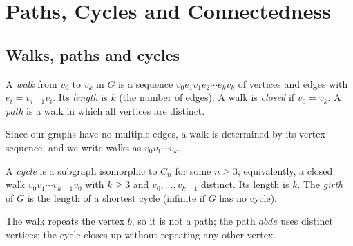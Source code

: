 \chapter{Paths, Cycles and Connectedness}


\section{Walks, paths and cycles}

\begin{definition}
A \emph{walk} from $v_0$ to $v_k$ in $G$ is a sequence $v_0e_1v_1e_2\cdots e_kv_k$ of
vertices and edges with $e_i = v_{i-1}v_i$. Its \emph{length} is $k$ (the number of edges). A
walk is \emph{closed} if $v_0 = v_k$. A \emph{path} is a walk in which all vertices are distinct.
\end{definition}

Since our graphs have no multiple edges, a walk is determined by its vertex sequence, and we
write walks as $v_0v_1\cdots v_k$.

\begin{definition}[Cycle]
A \emph{cycle} is a subgraph isomorphic to $C_n$ for some $n \ge 3$; equivalently, a closed walk
$v_0v_1\cdots v_{k-1}v_0$ with $k\ge3$ and $v_0,\dots,v_{k-1}$ distinct. Its length is $k$. The
\emph{girth} of $G$ is the length of a shortest cycle (infinite if $G$ has no cycle).
\end{definition}

\begin{center}
\end{center}
The walk repeats the vertex $b$, so it is not a path; the path $abde$ uses distinct vertices; the
cycle closes up without repeating any other vertex.

